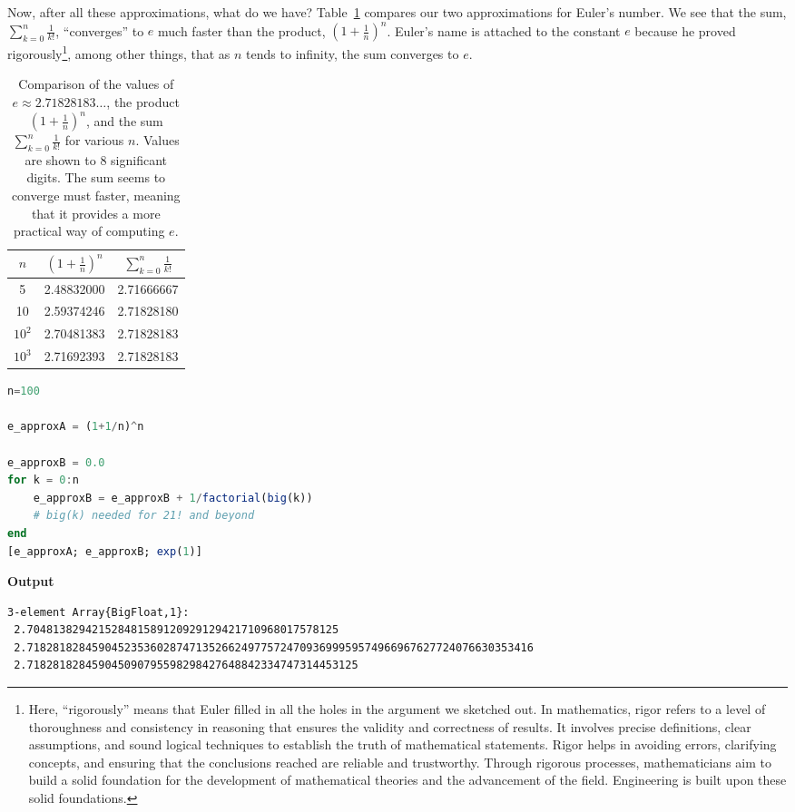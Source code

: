 Now, after all these approximations, what do we have? Table~\ref{tab:ComparisoncomputationEulerConstant} compares our two approximations for Euler's number. We see that the sum, $\sum_{k=0}^{n}\frac{1}{k!}$, ``converges'' to $e$ much faster than the product, $\left(1+{\frac {1}{n}}\right)^{n}$. Euler's name is attached to the constant $e$ because he proved rigorously\footnote{Here, ``rigorously'' means that Euler filled in all the holes in the argument we sketched out. In mathematics, rigor refers to a level of thoroughness and consistency in reasoning that ensures the validity and correctness of results. It involves precise definitions, clear assumptions, and sound logical techniques to establish the truth of mathematical statements. Rigor helps in avoiding errors, clarifying concepts, and ensuring that the conclusions reached are reliable and trustworthy. Through rigorous processes, mathematicians aim to build a solid foundation for the development of mathematical theories and the advancement of the field. Engineering is built upon these solid foundations.}, among other things, that as $n$ tends to infinity, the sum converges to $e$.


\begin{table}[hbt]
\centering
\begin{tabular}{|c|c|c|}
\hline 
$n$ & $(1+\frac{1}{n})^n$ & $\sum_{k=0}^{n}\frac{1}{k!}$ \\
\hline \hline
5  & 2.48832000 & 2.71666667 \\ 
\hline
10 & 2.59374246 & 2.71828180 \\
\hline
$10^2$ & 2.70481383 & 2.71828183\\
\hline
$10^3$ & 2.71692393 & 2.71828183 \\
\hline
\end{tabular}
\caption{Comparison of the values of $e \approx 2.71828183 \ldots$, the product $(1+\frac{1}{n})^n$, and the sum $\sum_{k=0}^{n}\frac{1}{k!}$ for various $n$. Values are shown to 8 significant digits. The sum seems to converge must faster, meaning that it provides a more practical way of computing $e$.}
\label{tab:ComparisoncomputationEulerConstant}
\end{table}

\begin{lstlisting}[language=Julia,style=mystyle]
n=100

e_approxA = (1+1/n)^n

e_approxB = 0.0
for k = 0:n
    e_approxB = e_approxB + 1/factorial(big(k))
    # big(k) needed for 21! and beyond
end
[e_approxA; e_approxB; exp(1)]
\end{lstlisting}
\textbf{Output} 
\begin{verbatim}
3-element Array{BigFloat,1}:
 2.704813829421528481589120929129421710968017578125
 2.718281828459045235360287471352662497757247093699959574966967627724076630353416
 2.718281828459045090795598298427648842334747314453125
\end{verbatim}


